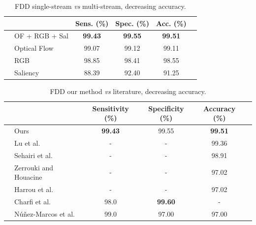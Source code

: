 \documentclass[conference]{IEEEtran}
\begin{document}
{\begin{table}[]
\centering
\caption{FDD single-stream \textit{vs} multi-stream, decreasing accuracy.}
\label{tab:fdd-ensem}
\begin{tabular}{llcccl}
\hline
 &  & Sens. (\%) & Spec. (\%) & Acc. (\%) &  \\ \hline
 & OF + RGB + Sal & \textbf{99.43} & \textbf{99.55} & \textbf{99.51} &  \\
 & Optical Flow & 99.07             & 99.12             & 99.11             &  \\
 & RGB & 98.85             & 98.41             & 98.55             &  \\
 & Saliency & 88.39             & 92.40             & 91.25             & \\ \hline
\end{tabular}
\end{table}

\begin{table}[t]
\centering
\caption{FDD our method \textit{vs} literature, decreasing accuracy.}
\label{tab:fdd-our-their}
\begin{tabular}{llcccl}
\hline
 &                                                      & Sensitivity (\%)  & Specificity (\%)  & Accuracy (\%)     & \\ \hline
 & Ours                                                 & \textbf{99.43}    & 99.55             & \textbf{99.51}    & \\
 & Lu et al.~\cite{lu2018deep}                          & -                 & -                 & 99.36             & \\
 & Sehairi et al.~\cite{sehairi2018elderly}             & -                 & -                 & 98.91             & \\
 & Zerrouki and Houacine~\cite{zerrouki2018combined}    & -                 & -                 & 97.02             & \\
 & Harrou et al.~\cite{harrou2017vision}                & -                 & -                 & 97.02             & \\
 & Charfi et al.~\cite{charfi2012definition}            & 98.0              & \textbf{99.60}    & -                 & \\
 & N\'u\~nez-Marcos et al.~\cite{nunez2017vision}       & 99.0              & 97.00             & 97.00             & \\ \hline
\end{tabular}
\end{table}
 
}
\end{document}

